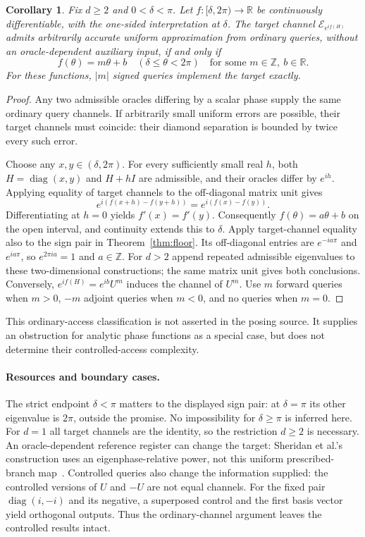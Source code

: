 \documentclass[11pt]{article}
\newtheorem{corollary}[theorem]{Corollary}
\newcommand{\E}{\mathcal E}
\begin{document}
\begin{corollary}\label{cor:functions}
Fix $d\geq2$ and $0<\delta<\pi$. Let
$f:[\delta,2\pi)\to\mathbb R$ be continuously differentiable, with the
one-sided interpretation at $\delta$. The target channel
$\E_{e^{if(H)}}$ admits arbitrarily accurate uniform approximation from
ordinary queries, without an oracle-dependent auxiliary input, if and only if
\[
 f(\theta)=m\theta+b\quad(\delta\leq\theta<2\pi)
 \quad\text{for some }m\in\mathbb Z,\ b\in\mathbb R.
\]
For these functions, $|m|$ signed queries implement the target exactly.
\end{corollary}
\begin{proof}
Any two admissible oracles differing by a scalar phase supply the same
ordinary query channels. If arbitrarily small uniform errors are possible,
their target channels must coincide: their diamond separation is bounded
by twice every such error.

Choose any $x,y\in(\delta,2\pi)$. For every sufficiently small real $h$,
both $H=\operatorname{diag}(x,y)$ and $H+hI$ are admissible, and their
oracles differ by $e^{ih}$. Applying equality of target channels to the
off-diagonal matrix unit gives
\[
 e^{i(f(x+h)-f(y+h))}=e^{i(f(x)-f(y))}.
\]
Differentiating at $h=0$ yields $f'(x)=f'(y)$.
Consequently $f(\theta)=a\theta+b$ on the open interval, and continuity
extends this to $\delta$.
Apply target-channel equality also to the sign pair in
Theorem~\ref{thm:floor}. Its off-diagonal entries are $e^{-ia\pi}$ and
$e^{ia\pi}$, so $e^{2\pi ia}=1$ and $a\in\mathbb Z$.
For $d>2$ append repeated admissible eigenvalues to these two-dimensional
constructions; the same matrix unit gives both conclusions.
Conversely, $e^{if(H)}=e^{ib}U^m$ induces the channel of $U^m$.
Use $m$ forward queries when $m>0$, $-m$ adjoint queries when $m<0$,
and no queries when $m=0$.
\end{proof}
This ordinary-access classification is not asserted in the posing source.
It supplies an obstruction for analytic phase functions as a special case,
but does not determine their controlled-access complexity.

\paragraph{Resources and boundary cases.}
The strict endpoint $\delta<\pi$ matters to the displayed sign pair:
at $\delta=\pi$ its other eigenvalue is $2\pi$, outside the promise.
No impossibility for $\delta\geq\pi$ is inferred here.
For $d=1$ all target channels are the identity, so the restriction $d\geq2$
is necessary. An oracle-dependent reference register can change the target:
Sheridan et al.'s construction uses an eigenphase-relative power, not this
uniform prescribed-branch map~\cite[Appendix A]{sheridan}.
Controlled queries also change the information supplied: the controlled
versions of $U$ and $-U$ are not equal channels. For the fixed pair
$\operatorname{diag}(i,-i)$ and its negative, a superposed control and
the first basis vector yield orthogonal outputs. Thus the ordinary-channel
argument leaves the controlled results intact.
\end{document}
